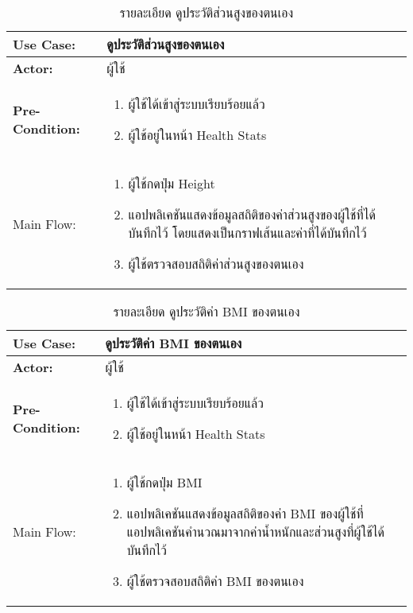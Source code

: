 \begin{table}
    \caption{รายละเอียด ดูประวัติส่วนสูงของตนเอง}
    \begin{tabularx}{\textwidth}{ | >{\centering\bf} p{3cm} | X |}
        \hline
        Use Case: & ดูประวัติส่วนสูงของตนเอง \\\hline
        Actor: & ผู้ใช้ \\\hline
        Pre-Condition: &
        \begin{enumerate}[table]
            \item ผู้ใช้ได้เข้าสู่ระบบเรียบร้อยแล้ว
            \item ผู้ใช้อยู่ในหน้า Health Stats          
        \end{enumerate} \\\hline
        
        Main Flow: & 
        \begin{enumerate}[table]
            \item ผู้ใช้กดปุ่ม Height
            \item แอปพลิเคชันแสดงข้อมูลสถิติของค่าส่วนสูงของผู้ใช้ที่ได้บันทึกไว้ โดยแสดงเป็นกราฟเส้นและค่าที่ได้บันทึกไว้
            \item ผู้ใช้ตรวจสอบสถิติค่าส่วนสูงของตนเอง   
        \end{enumerate}\\\hline
    \end{tabularx}
\end{table}


\begin{table}
    \caption{รายละเอียด ดูประวัติค่า BMI ของตนเอง}
    \begin{tabularx}{\textwidth}{ | >{\centering\bf} p{3cm} | X |}
        \hline
        Use Case: & ดูประวัติค่า BMI ของตนเอง \\\hline
        Actor: & ผู้ใช้ \\\hline
        Pre-Condition: &
        \begin{enumerate}[table]
            \item ผู้ใช้ได้เข้าสู่ระบบเรียบร้อยแล้ว
            \item ผู้ใช้อยู่ในหน้า Health Stats
        \end{enumerate} \\\hline
        
        Main Flow: & 
        \begin{enumerate}[table]
            \item ผู้ใช้กดปุ่ม BMI
            \item แอปพลิเคชันแสดงข้อมูลสถิติของค่า BMI ของผู้ใช้ที่แอปพลิเคชันคำนวณมาจากค่าน้ำหนักและส่วนสูงที่ผู้ใช้ได้บันทึกไว้
            \item ผู้ใช้ตรวจสอบสถิติค่า BMI ของตนเอง
        \end{enumerate}\\\hline
    \end{tabularx}
\end{table}



